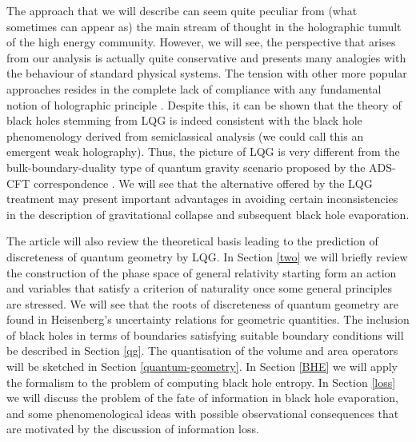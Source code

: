 \documentclass[aps, nofootinbib,superscriptaddress,12pt]{revtex4-2}
\begin{document}
The approach that we will describe can seem quite peculiar from (what sometimes can appear as) the main stream of thought in the holographic tumult of the high energy community. However, we will see, the perspective that arises from our analysis is actually quite conservative and presents many analogies with the behaviour of standard physical systems. 
The tension with other more popular approaches resides in the complete lack of compliance with any fundamental  notion of holographic principle \cite{Bousso:2002ju}.  Despite this, it can be shown that the theory of black holes stemming from LQG is indeed consistent with the black hole phenomenology derived from semiclassical analysis (we could call this an emergent weak holography). Thus, the  picture of LQG is very different from the bulk-boundary-duality type of quantum gravity scenario  proposed by  the ADS-CFT correspondence \cite{Maldacena:1997re}.  We will see that the alternative offered by the LQG treatment may present important advantages in avoiding certain inconsistencies in the description of gravitational collapse and subsequent black hole evaporation. 

The article will also review the theoretical basis leading to the prediction of discreteness of quantum geometry by LQG.
In Section \ref{two} we will briefly review the construction of the phase space of general relativity starting form an action and variables that satisfy a criterion of naturality once some general principles are stressed. We will see that the roots of discreteness of quantum geometry are found in Heisenberg's uncertainty  relations for geometric quantities.  The inclusion of black holes in terms of boundaries satisfying suitable boundary conditions will be described in Section \ref{qg}. The quantisation of the volume and area operators will be sketched in Section \ref{quantum-geometry}. In Section \ref{BHE}  we will apply the formalism to the problem of computing black hole entropy. In Section \ref{loss} we will discuss the problem of the fate of information in black hole evaporation, and some phenomenological ideas with possible observational consequences that are motivated by the discussion of information loss. 
\end{document}
